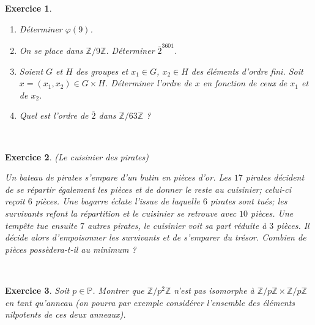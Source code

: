 \documentclass[11pt,a4paper]{article}
\newtheorem{ex}{Exercice}
\newcommand{\Z}{\mathbb{Z}}
\begin{document}
\

\


\begin{ex}\label{Calcul_puissance}
\begin{enumerate}

\item Déterminer $\varphi(9)$.


\item On se place dans $\Z/9\Z$. Déterminer $\overline{2}^{3601}$.

\item Soient $G$ et $H$ des groupes et $x_1\in G$, $x_2\in H$ des éléments d'ordre fini.  Soit $x=(x_1,x_2)\in G\times H$. Déterminer l'ordre de 
$x$ en fonction de ceux de $x_1$ et de $x_2$.

\item Quel est l'ordre de $\overline{2}$ dans $\Z/63\Z$ ?
\end{enumerate}
\end{ex}



\



\begin{ex}\label{cuisinier_pirates}(Le cuisinier des pirates)\

Un bateau de pirates s'empare d'un butin en pièces d'or. Les $17$ pirates décident de se répartir également les pièces et de donner le reste au cuisinier; celui-ci reçoit $6$ pièces. Une bagarre éclate  l'issue de laquelle $6$ pirates sont tués; les survivants refont la répartition et le cuisinier se retrouve avec $10$ pièces. Une tempête tue ensuite $7$ autres pirates, le cuisinier voit sa part réduite à $3$ pièces. Il décide alors d'empoisonner les survivants et de s'emparer du trésor. Combien de pièces possèdera-t-il au minimum ?


\end{ex}


\



\begin{ex}\label{non_isomorphisme}
Soit $p\in \mathbb{P}$. Montrer que $\Z/p^2\Z$ n'est pas isomorphe à $\Z/p\Z\times \Z/p\Z$ en tant qu'anneau (on pourra par exemple considérer l'ensemble des éléments nilpotents de ces deux anneaux). 
\end{ex}

\
\end{document}
